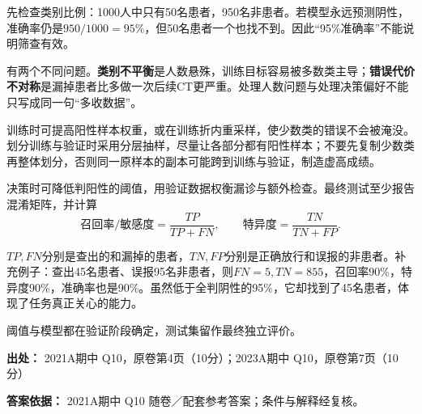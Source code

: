 先检查类别比例：1000人中只有50名患者，950名非患者。若模型永远预测阴性，准确率仍是\(950/1000=95\%\)，但50名患者一个也找不到。因此“95\%准确率”不能说明筛查有效。


有两个不同问题。\textbf{类别不平衡}是人数悬殊，训练目标容易被多数类主导；\textbf{错误代价不对称}是漏掉患者比多做一次后续CT更严重。处理人数问题与处理决策偏好不能只写成同一句“多收数据”。


训练时可提高阳性样本权重，或在训练折内重采样，使少数类的错误不会被淹没。划分训练与验证时采用分层抽样，尽量让各部分都有阳性样本；不要先复制少数类再整体划分，否则同一原样本的副本可能跨到训练与验证，制造虚高成绩。


决策时可降低判阳性的阈值，用验证数据权衡漏诊与额外检查。最终测试至少报告混淆矩阵，并计算
\[
\text{召回率/敏感度}=\frac{TP}{TP+FN},\qquad
\text{特异度}=\frac{TN}{TN+FP}.
\]


\(TP,FN\)分别是查出的和漏掉的患者，\(TN,FP\)分别是正确放行和误报的非患者。补充例子：查出45名患者、误报95名非患者，则\(FN=5,TN=855\)，召回率90\%，特异度90\%，准确率也是90\%。虽然低于全判阴性的95\%，它却找到了45名患者，体现了任务真正关心的能力。


阈值与模型都在验证阶段确定，测试集留作最终独立评价。


\textbf{出处：} 2021A期中 Q10，原卷第4页（10分）；2023A期中 Q10，原卷第7页（10分）


\textbf{答案依据：} 2021A期中 Q10 随卷／配套参考答案；条件与解释经复核。

